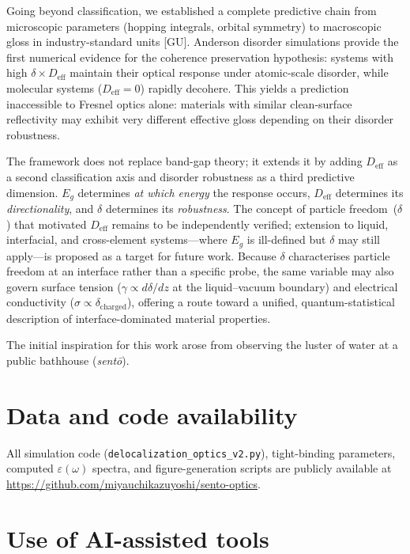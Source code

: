\documentclass[twocolumn,showpacs,preprintnumbers,amsmath,amssymb,prb]{revtex4-2}
\begin{document}
Going beyond classification, we established a complete predictive
chain from microscopic parameters (hopping integrals, orbital symmetry)
to macroscopic gloss in industry-standard units [GU]. Anderson disorder
simulations provide the first numerical evidence for the coherence
preservation hypothesis: systems with high $\delta \times D_\mathrm{eff}$
maintain their optical response under atomic-scale disorder, while
molecular systems ($D_\mathrm{eff} = 0$) rapidly decohere. This yields
a prediction inaccessible to Fresnel optics alone: materials with
similar clean-surface reflectivity may exhibit very different effective
gloss depending on their disorder robustness.

The framework does not replace band-gap theory; it extends it by
adding $D_\mathrm{eff}$ as a second classification axis and disorder
robustness as a third predictive dimension.
$E_g$ determines \emph{at which energy} the response occurs,
$D_\mathrm{eff}$ determines its \emph{directionality}, and
$\delta$ determines its \emph{robustness}. The concept of
particle freedom~($\delta$) that motivated $D_\mathrm{eff}$ remains to
be independently verified; extension to liquid, interfacial, and
cross-element systems---where $E_g$ is ill-defined but $\delta$ may
still apply---is proposed as a target for future work.
Because $\delta$ characterises particle freedom at an interface rather
than a specific probe, the same variable may also govern surface
tension ($\gamma \propto d\delta/dz$ at the liquid--vacuum boundary)
and electrical conductivity ($\sigma \propto \delta_\mathrm{charged}$),
offering a route toward a unified, quantum-statistical description of
interface-dominated material properties.

\begin{acknowledgments}
The initial inspiration for this work arose from observing the luster
of water at a public bathhouse (\textit{sent\=o}).
\end{acknowledgments}

\section*{Data and code availability}

All simulation code (\texttt{delocalization\_optics\_v2.py}),
tight-binding parameters, computed $\varepsilon(\omega)$ spectra,
and figure-generation scripts are publicly available at
\url{https://github.com/miyauchikazuyoshi/sento-optics}.

\section*{Use of AI-assisted tools}
\end{document}
